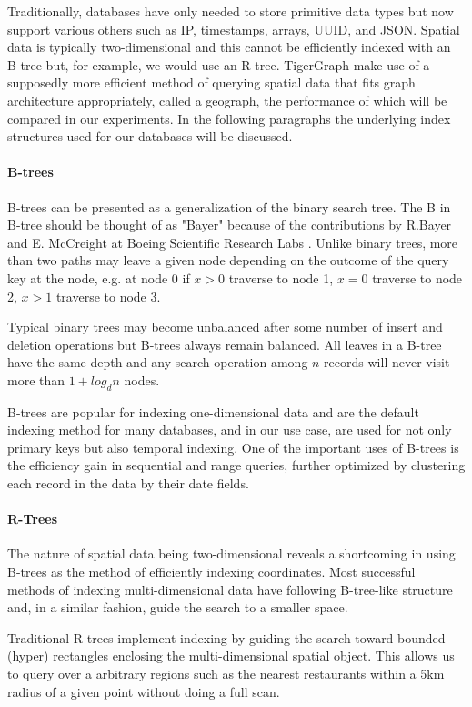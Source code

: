 Traditionally, databases have only needed to store primitive data types but now support various others such as IP, timestamps, arrays, UUID, and JSON. Spatial data is typically two-dimensional and this cannot be efficiently indexed with an B-tree but, for example, we would use an R-tree. TigerGraph make use of a supposedly more efficient method of querying spatial data that fits graph architecture appropriately, called a geograph, the performance of which will be compared in our experiments. In the following paragraphs the underlying index structures used for our databases will be discussed.

\paragraph{B-trees}
B-trees can be presented as a generalization of the binary search tree. The B in B-tree should be thought of as "Bayer" because of the contributions by R.Bayer and E. McCreight at Boeing Scientific Research Labs \cite{btree}. Unlike binary trees, more than two paths may leave a given node depending on the outcome of the query key at the node, e.g. at node 0 if $x>0$ traverse to node 1, $x=0$ traverse to node 2, $x>1$ traverse to node 3.

Typical binary trees may become unbalanced after some number of insert and deletion operations but B-trees always remain balanced. All leaves in a B-tree have the same depth and any search operation among $n$ records will never visit more than $1 + log_dn$ nodes.

B-trees are popular for indexing one-dimensional data and are the default indexing method for many databases, and in our use case, are used for not only primary keys but also temporal indexing. One of the important uses of B-trees is the efficiency gain in sequential and range queries, further optimized by clustering each record in the data by their date fields.

\paragraph{R-Trees}

The nature of spatial data being two-dimensional reveals a shortcoming in using B-trees as the method of efficiently indexing coordinates. Most successful methods of indexing multi-dimensional data have following B-tree-like structure \cite{rtree} and, in a similar fashion, guide the search to a smaller space.

Traditional R-trees implement indexing by guiding the search toward bounded (hyper) rectangles enclosing the multi-dimensional spatial object. This allows us to query over a arbitrary regions such as the nearest restaurants within a 5km radius of a given point without doing a full scan.

